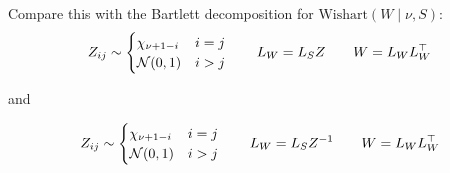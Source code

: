 \documentclass{article}
\newcommand{\Wish}{\text{Wishart}}
\begin{document}
Compare this with the Bartlett decomposition for $\Wish(W \mid \nu, S)$:
\[
    Z_{ij} \sim \begin{cases} \chi_{\nu+1-i} & i = j\\ \mathcal{N}(0, 1) & i > j \end{cases} \qquad L_W = L_S Z \qquad W = L_W L_W^\top\\
\]

and

\[
    Z_{ij} \sim \begin{cases} \chi_{\nu+1-i} & i = j\\ \mathcal{N}(0, 1) & i > j \end{cases} \qquad L_W = L_S Z^{-1} \qquad W = L_W L_W^\top\\
\]
\end{document}
